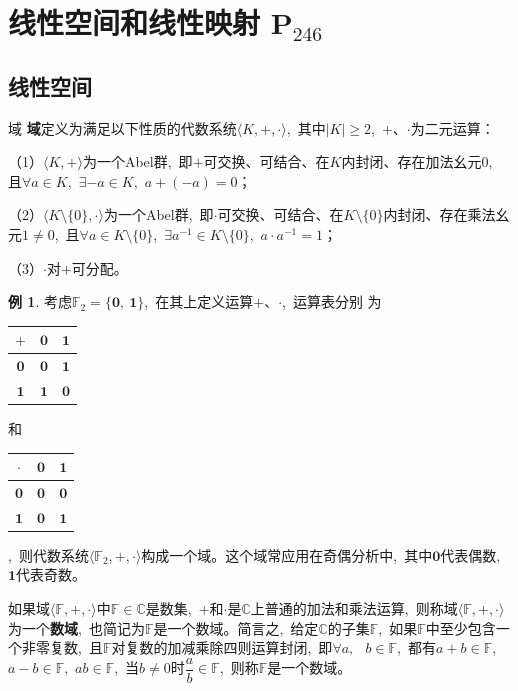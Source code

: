 \documentclass[10pt, a4paper, oneside, fontset=none]{ctexart}
\theoremstyle{plain}
\theoremstyle{definition}
\newtheorem{example}[theorem]{例}
\newcommand{\com}{,\,\,\,\:}
\newcommand{\de}[2][]{\begin{defil}{#1}\kai #2\end{defil}}
\newcommand{\C}{\mathbb{C}}
\newcommand*{\page}[1]{\hfill P$_\text{#1}$}
\newcommand{\tboba}[1]{\textbf{\kai\color{bali!75!black}#1}}
\begin{document}
\newpage
\section[线性空间和线性映射]{线性空间和线性映射 \page{246}}
\newcommand{\bF}{\mathbb{F}}
\renewcommand{\a}[1]{\langle #1 \rangle}
\subsection{线性空间}
\de[域]{
    \tboba{域}定义为满足以下性质的代数系统$\a{K,+,\cdot}$\com 其中$|K|\ge 2$\com $+$、$\cdot$为二元运算：

    （1）$\a{K,+}$为一个Abel群\com 即$+$可交换、可结合、在$K$内封闭、存在加法幺元$0$\com 且$\forall a \in K$\com $\exists -a \in K$\com $a+(-a)=0$；

    （2）$\a{K\setminus\{0\},\cdot}$为一个Abel群\com 即$\cdot$可交换、可结合、在$K\setminus\{0\}$内封闭、存在乘法幺元$1 \neq 0$\com 且$\forall a \in K\setminus\{0\}$\com $\exists a^{-1} \in K\setminus\{0\}$\com $a \cdot a^{-1} = 1$；

    （3）$\cdot$对$+$可分配。
}
\newcommand{\0}{\boldsymbol{0}}
\newcommand{\1}{\boldsymbol{1}}
\begin{example}
    考虑$\bF_2=\{\0,~\1\}$\com 在其上定义运算$+$、$\cdot$\com 运算表分别
    为
    \begin{tabular}{c|cc}
        $+$ & $\0$ & $\1$ \\
        \hline
        $\0$ & $\0$ & $\1$ \\
        $\1$ & $\1$ & $\0$
    \end{tabular}
    和
    \begin{tabular}{c|cc}
        $\cdot$ & $\0$ & $\1$ \\
        \hline
        $\0$ & $\0$ & $\0$ \\
        $\1$ & $\0$ & $\1$
    \end{tabular}
    \com 则代数系统$\a{\bF_2,+,\cdot}$构成一个域。这个域常应用在奇偶分析中\com 其中$\0$代表偶数\com $\1$代表奇数。
\end{example}

如果域$\a{\bF,+,\cdot}$中$\bF \in \C$是数集\com $+$和$\cdot$是$\C$上普通的加法和乘法运算\com 则称域$\a{\bF,+,\cdot}$为一个\tboba{数域}\com 也简记为$\bF$是一个数域。简言之\com 给定$\C$的子集$\bF$\com 如果$\bF$中至少包含一个非零复数\com 且$\bF$对复数的加减乘除四则运算封闭\com 即$\forall a\com b \in \bF$\com 都有$a+b\in \bF$\com $a-b\in \bF$\com $ab\in \bF$\com 当$b\neq 0$时$\dfrac{a}{b} \in \bF$\com 则称$\bF$是一个数域。
\end{document}
